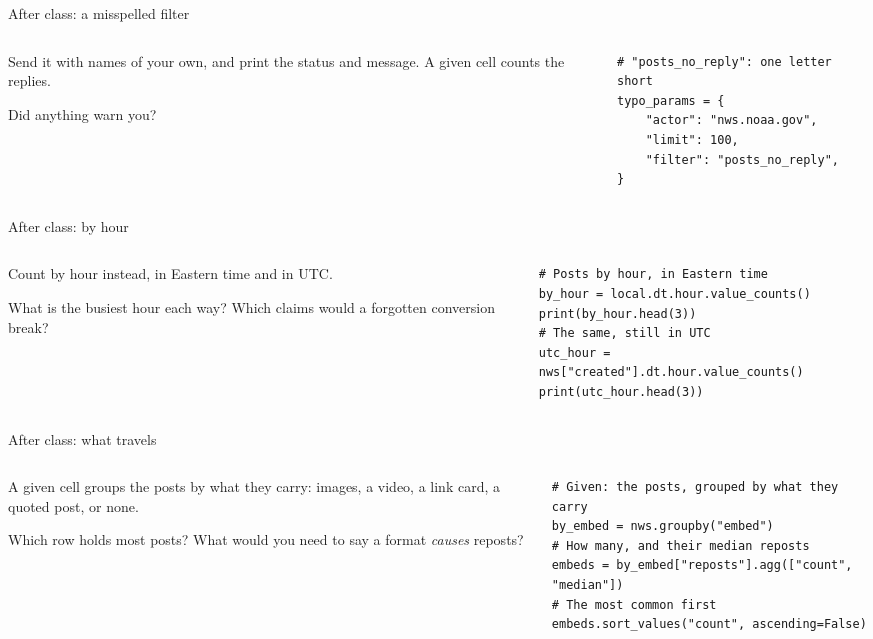 \documentclass[9pt,aspectratio=169]{beamer}
\begin{document}
\begin{frame}[fragile]{After class: a misspelled filter}
    \begin{columns}[T]
        \begin{column}{0.37\textwidth}
            Send it with names of your own, and print the status and message. A given cell counts the replies.

            \medskip
            Did anything warn you?
        \end{column}
        \begin{column}{0.6\textwidth}
\begin{lstlisting}
# "posts_no_reply": one letter short
typo_params = {
    "actor": "nws.noaa.gov",
    "limit": 100,
    "filter": "posts_no_reply",
}
\end{lstlisting}
        \end{column}
    \end{columns}
\end{frame}

\begin{frame}[fragile]{After class: by hour}
    \begin{columns}[T]
        \begin{column}{0.37\textwidth}
            Count by hour instead, in Eastern time and in UTC.

            \medskip
            What is the busiest hour each way? Which claims would a forgotten conversion break?
        \end{column}
        \begin{column}{0.6\textwidth}
\begin{lstlisting}
# Posts by hour, in Eastern time
by_hour = local.dt.hour.value_counts()
print(by_hour.head(3))
# The same, still in UTC
utc_hour = nws["created"].dt.hour.value_counts()
print(utc_hour.head(3))
\end{lstlisting}
        \end{column}
    \end{columns}
\end{frame}

\begin{frame}[fragile]{After class: what travels}
    \begin{columns}[T]
        \begin{column}{0.37\textwidth}
            A given cell groups the posts by what they carry: images, a video, a link card, a quoted post, or none.

            \medskip
            Which row holds most posts? What would you need to say a format \textit{causes} reposts?
        \end{column}
        \begin{column}{0.6\textwidth}
\begin{lstlisting}
# Given: the posts, grouped by what they carry
by_embed = nws.groupby("embed")
# How many, and their median reposts
embeds = by_embed["reposts"].agg(["count", "median"])
# The most common first
embeds.sort_values("count", ascending=False)
\end{lstlisting}
        \end{column}
    \end{columns}
\end{frame}
\end{document}
